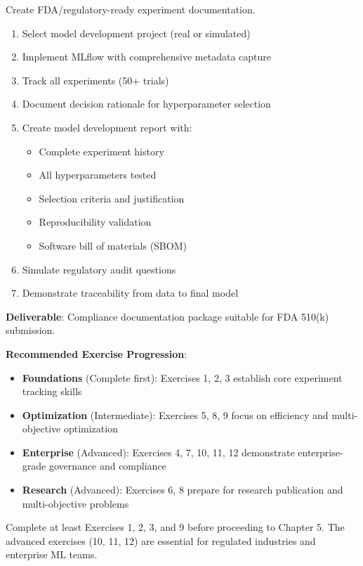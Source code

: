 Create FDA/regulatory-ready experiment documentation.

\begin{enumerate}
    \item Select model development project (real or simulated)
    \item Implement MLflow with comprehensive metadata capture
    \item Track all experiments (50+ trials)
    \item Document decision rationale for hyperparameter selection
    \item Create model development report with:
    \begin{itemize}
        \item Complete experiment history
        \item All hyperparameters tested
        \item Selection criteria and justification
        \item Reproducibility validation
        \item Software bill of materials (SBOM)
    \end{itemize}
    \item Simulate regulatory audit questions
    \item Demonstrate traceability from data to final model
\end{enumerate}

\textbf{Deliverable}: Compliance documentation package suitable for FDA 510(k) submission.

\vspace{1cm}

\textbf{Recommended Exercise Progression}:

\begin{itemize}
    \item \textbf{Foundations} (Complete first): Exercises 1, 2, 3 establish core experiment tracking skills
    \item \textbf{Optimization} (Intermediate): Exercises 5, 8, 9 focus on efficiency and multi-objective optimization
    \item \textbf{Enterprise} (Advanced): Exercises 4, 7, 10, 11, 12 demonstrate enterprise-grade governance and compliance
    \item \textbf{Research} (Advanced): Exercises 6, 8 prepare for research publication and multi-objective problems
\end{itemize}

Complete at least Exercises 1, 2, 3, and 9 before proceeding to Chapter 5. The advanced exercises (10, 11, 12) are essential for regulated industries and enterprise ML teams.
